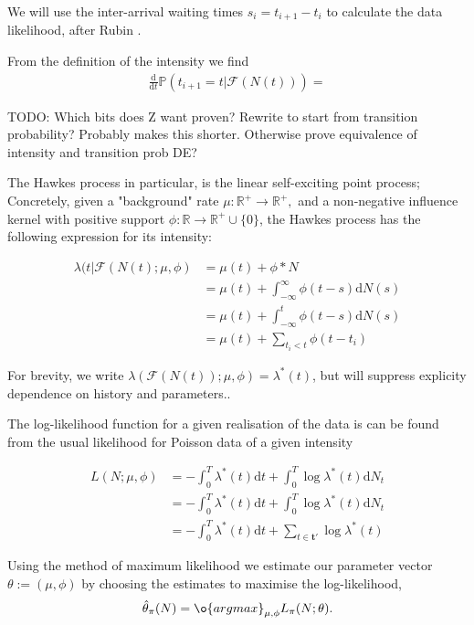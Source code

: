 \documentclass[11pt]{article}
\def\lt{<}
\newcommand{\dd}{\mathrm{d}}
\newcommand{\bb}[1]{\mathbb{#1}}
\renewcommand{\v}[1]{\boldsymbol{#1}}
\begin{document}
    We will use the inter-arrival waiting times \(s_i=t_{i+1}-t_i\) to
calculate the data likelihood, after Rubin \cite{rubin_regular_1972}.

From the definition of the intensity we find \[\begin{aligned}
\frac{\dd}{\dd t}\bb P(t_{i+1}=t|\mathcal{F}(N(t)))=
\end{aligned}\]

TODO: Which bits does Z want proven? Rewrite to start from transition
probability? Probably makes this shorter. Otherwise prove equivalence of
intensity and transition prob DE?

    The Hawkes process \cite{hawkes_point_1971} in particular, is the linear
self-exciting point process; Concretely, given a "background" rate
\(\mu:\mathbb{R}^+\rightarrow\mathbb{R}^+,\) and a non-negative
influence kernel with positive support
\(\phi:\mathbb{R}\rightarrow\mathbb{R}^+\cup\{0\}\), the Hawkes process
has the following expression for its intensity:

\[
\begin{aligned}
\lambda(t|\mathcal{F}(N(t);\mu,\phi) &= \mu(t) + \phi * N\\
&= \mu(t)  + \int_{-\infty}^{\infty}\phi(t-s)\dd N(s)\\
&= \mu(t) + \int_{-\infty}^{t}\phi(t-s)\dd N(s)\\
&= \mu(t) + \sum_{t_i\lt t}\phi(t-t_i)
\end{aligned}
\]

For brevity, we write
\(\lambda(\mathcal{F}(N(t));\mu,\phi)=\lambda^*(t)\), but will suppress
explicity dependence on history and parameters..

    The log-likelihood function for a given realisation of the data is can
be found from the usual likelihood for Poisson data of a given intensity
\cite{ozaki_etimating_1979}

\[\begin{aligned}L(N;\mu,\phi) &=-\int_0^T\lambda^*(t) \dd t + \int_0^T\log \lambda^*(t) \dd N_t \\
&=-\int_0^T\lambda^*(t)\dd t + \int_0^T\log \lambda^*(t) \dd N_t \\
&=-\int_0^T\lambda^*(t)\dd t + \sum_{t\in\v{t}'}\log \lambda^*(t)
\end{aligned}\]

Using the method of maximum likelihood we estimate our parameter vector
\(\theta:=(\mu, \phi)\) by choosing the estimates to maximise the
log-likelihood,
\[\hat{\theta}_\pi(N) = \o{argmax}_{\mu,\phi} L_\pi(N;\theta).\]
\end{document}
